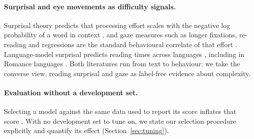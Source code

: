 \paragraph{Surprisal and eye movements as difficulty signals.}
Surprisal theory predicts that processing effort scales with the
negative log probability of a word in context \citep{hale2001probabilistic},
and gaze measures such as longer fixations, re-reading and regressions
are the standard behavioural correlate of that effort
\citep{rayner1998eye}. Language-model surprisal predicts reading times
across languages \citep{hollenstein-etal-2021-multilingual}, including
in Romance languages \citep{alves-2025-benchmarking}. Both literatures
run from text to behaviour; we take the converse view, reading surprisal
and gaze as label-free evidence about complexity.

\paragraph{Evaluation without a development set.}
Selecting a model against the same data used to report its score inflates
that score \citep{gorman-bedrick-2019-need}. With no development set to
tune on, we state our selection procedure explicitly and quantify its
effect (Section~\ref{sec:tuning}).
